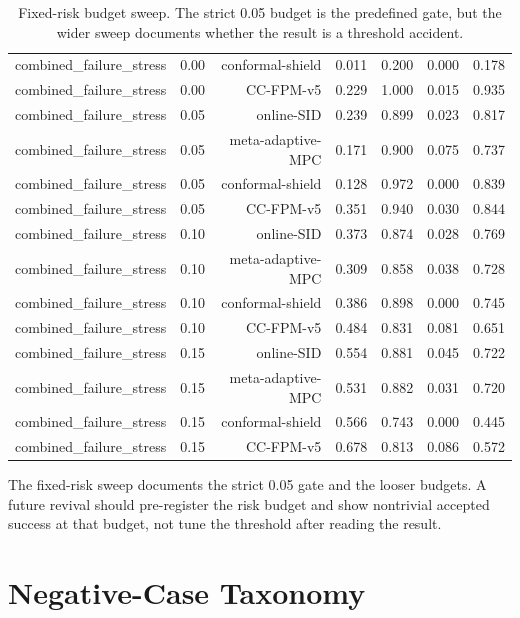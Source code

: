 \documentclass{article}
\begin{document}
\begin{table}[t]
{\begin{tabular}{llrrrrr}
combined\_failure\_stress & 0.00 & conformal-shield & 0.011 & 0.200 & 0.000 & 0.178 \\
combined\_failure\_stress & 0.00 & CC-FPM-v5 & 0.229 & 1.000 & 0.015 & 0.935 \\
combined\_failure\_stress & 0.05 & online-SID & 0.239 & 0.899 & 0.023 & 0.817 \\
combined\_failure\_stress & 0.05 & meta-adaptive-MPC & 0.171 & 0.900 & 0.075 & 0.737 \\
combined\_failure\_stress & 0.05 & conformal-shield & 0.128 & 0.972 & 0.000 & 0.839 \\
combined\_failure\_stress & 0.05 & CC-FPM-v5 & 0.351 & 0.940 & 0.030 & 0.844 \\
combined\_failure\_stress & 0.10 & online-SID & 0.373 & 0.874 & 0.028 & 0.769 \\
combined\_failure\_stress & 0.10 & meta-adaptive-MPC & 0.309 & 0.858 & 0.038 & 0.728 \\
combined\_failure\_stress & 0.10 & conformal-shield & 0.386 & 0.898 & 0.000 & 0.745 \\
combined\_failure\_stress & 0.10 & CC-FPM-v5 & 0.484 & 0.831 & 0.081 & 0.651 \\
combined\_failure\_stress & 0.15 & online-SID & 0.554 & 0.881 & 0.045 & 0.722 \\
combined\_failure\_stress & 0.15 & meta-adaptive-MPC & 0.531 & 0.882 & 0.031 & 0.720 \\
combined\_failure\_stress & 0.15 & conformal-shield & 0.566 & 0.743 & 0.000 & 0.445 \\
combined\_failure\_stress & 0.15 & CC-FPM-v5 & 0.678 & 0.813 & 0.086 & 0.572 \\
\bottomrule
\end{tabular}}
\caption{Fixed-risk budget sweep. The strict 0.05 budget is the predefined gate, but the wider sweep documents whether the result is a threshold accident.}
\label{tab:fixedsweep}
\end{table}


The fixed-risk sweep documents the strict 0.05 gate and the looser budgets. A future revival should pre-register the risk budget and show nontrivial accepted success at that budget, not tune the threshold after reading the result.

\section{Negative-Case Taxonomy}
\end{document}
